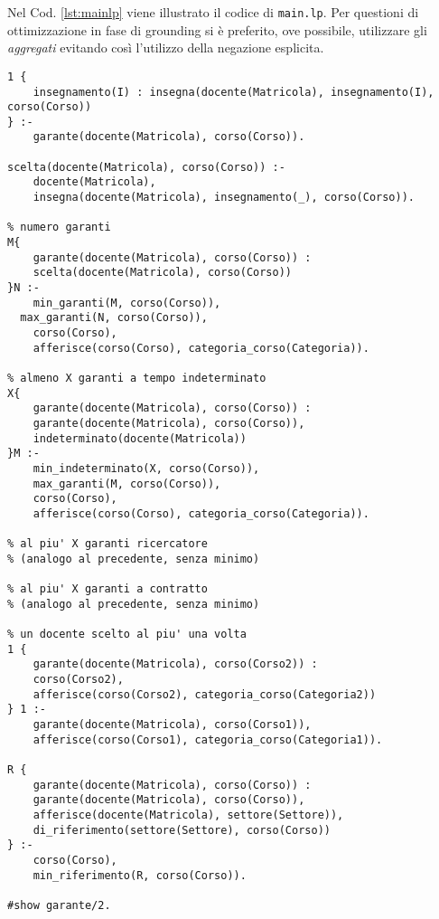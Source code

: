 Nel Cod. \ref{lst:mainlp} viene illustrato il codice di \texttt{main.lp}. Per
questioni di ottimizzazione in fase di grounding si è preferito, ove possibile, utilizzare gli
\textit{aggregati} evitando così l'utilizzo della negazione esplicita.

\begin{center}
\begin{lstlisting}[style=asp, caption={Codice ASP del file \texttt{main.lp}.}, label={lst:mainlp}]
% se garante allora insegna almeno una materia
1 {
    insegnamento(I) : insegna(docente(Matricola), insegnamento(I), corso(Corso))
} :-
    garante(docente(Matricola), corso(Corso)).

scelta(docente(Matricola), corso(Corso)) :-
	docente(Matricola),
	insegna(docente(Matricola), insegnamento(_), corso(Corso)).

% numero garanti
M{
	garante(docente(Matricola), corso(Corso)) :
	scelta(docente(Matricola), corso(Corso))
}N :-
	min_garanti(M, corso(Corso)),
  max_garanti(N, corso(Corso)),
	corso(Corso),
	afferisce(corso(Corso), categoria_corso(Categoria)).

% almeno X garanti a tempo indeterminato
X{
	garante(docente(Matricola), corso(Corso)) :
	garante(docente(Matricola), corso(Corso)),
	indeterminato(docente(Matricola))
}M :-
	min_indeterminato(X, corso(Corso)),
	max_garanti(M, corso(Corso)),
	corso(Corso),
	afferisce(corso(Corso), categoria_corso(Categoria)).

% al piu' X garanti ricercatore
% (analogo al precedente, senza minimo)

% al piu' X garanti a contratto
% (analogo al precedente, senza minimo)

% un docente scelto al piu' una volta
1 {
    garante(docente(Matricola), corso(Corso2)) :
    corso(Corso2),
    afferisce(corso(Corso2), categoria_corso(Categoria2))
} 1 :-
    garante(docente(Matricola), corso(Corso1)),
    afferisce(corso(Corso1), categoria_corso(Categoria1)).

R {
    garante(docente(Matricola), corso(Corso)) :
    garante(docente(Matricola), corso(Corso)),
    afferisce(docente(Matricola), settore(Settore)),
    di_riferimento(settore(Settore), corso(Corso))
} :-
    corso(Corso),
    min_riferimento(R, corso(Corso)).

#show garante/2.
\end{lstlisting}
\end{center}

